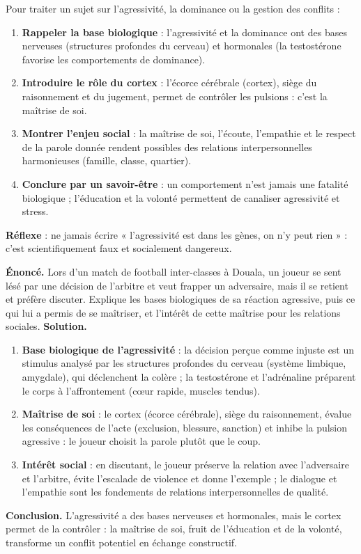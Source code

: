 \documentclass[11pt]{article}
\newcommand{\cle}[1]{{\popxbold\color{popdark}#1}}
\begin{document}
\begin{methode}
Pour traiter un sujet sur l'agressivité, la dominance ou la gestion des conflits :
\begin{enumerate}
\item \textbf{Rappeler la base biologique} : l'agressivité et la dominance ont des bases nerveuses (structures profondes du cerveau) et hormonales (la \cle{testostérone} favorise les comportements de dominance).
\item \textbf{Introduire le rôle du cortex} : l'écorce cérébrale (\cle{cortex}), siège du raisonnement et du jugement, permet de \cle{contrôler} les pulsions : c'est la maîtrise de soi.
\item \textbf{Montrer l'enjeu social} : la maîtrise de soi, l'écoute, l'empathie et le respect de la parole donnée rendent possibles des relations interpersonnelles harmonieuses (famille, classe, quartier).
\item \textbf{Conclure par un savoir-être} : un comportement n'est jamais une fatalité biologique ; l'éducation et la volonté permettent de canaliser agressivité et stress.
\end{enumerate}
\textbf{Réflexe} : ne jamais écrire « l'agressivité est dans les gènes, on n'y peut rien » : c'est scientifiquement faux et socialement dangereux.
\end{methode}

\begin{exoresolu}
\textbf{Énoncé.} Lors d'un match de football inter-classes à Douala, un joueur se sent lésé par une décision de l'arbitre et veut frapper un adversaire, mais il se retient et préfère discuter. Explique les bases biologiques de sa réaction agressive, puis ce qui lui a permis de se maîtriser, et l'intérêt de cette maîtrise pour les relations sociales.
\tcblower
\textbf{Solution.}
\begin{enumerate}
\item \textbf{Base biologique de l'agressivité} : la décision perçue comme injuste est un stimulus analysé par les structures profondes du cerveau (système limbique, amygdale), qui déclenchent la colère ; la \cle{testostérone} et l'\cle{adrénaline} préparent le corps à l'affrontement (cœur rapide, muscles tendus).
\item \textbf{Maîtrise de soi} : le \cle{cortex} (écorce cérébrale), siège du raisonnement, évalue les conséquences de l'acte (exclusion, blessure, sanction) et inhibe la pulsion agressive : le joueur choisit la parole plutôt que le coup.
\item \textbf{Intérêt social} : en discutant, le joueur préserve la relation avec l'adversaire et l'arbitre, évite l'escalade de violence et donne l'exemple ; le dialogue et l'empathie sont les fondements de relations interpersonnelles de qualité.
\end{enumerate}
\textbf{Conclusion.} L'agressivité a des bases nerveuses et hormonales, mais le cortex permet de la contrôler : la maîtrise de soi, fruit de l'éducation et de la volonté, transforme un conflit potentiel en échange constructif.
\end{exoresolu}
\end{document}
